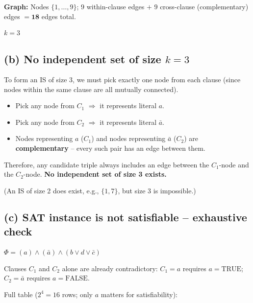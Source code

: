 \documentclass[12pt]{article}
\begin{document}
\noindent\textbf{Graph:}  Nodes $\{1,\ldots,9\}$;
$9$ within-clause edges $+$ $9$ cross-clause (complementary) edges
$= \mathbf{18}$ edges total.

$k = 3$

\subsection*{(b) No independent set of size $k = 3$}

To form an IS of size 3, we must pick exactly one node from each clause
(since nodes within the same clause are all mutually connected).

\begin{itemize}
  \item Pick any node from $C_1$ $\Rightarrow$ it represents literal $a$.
  \item Pick any node from $C_2$ $\Rightarrow$ it represents literal $\bar{a}$.
  \item Nodes representing $a$ ($C_1$) and nodes representing $\bar{a}$ ($C_2$)
        are \textbf{complementary} -- every such pair has an edge between them.
\end{itemize}

Therefore, any candidate triple always includes an edge between the $C_1$-node
and the $C_2$-node.  \textbf{No independent set of size 3 exists.}

(An IS of size 2 does exist, e.g., $\{1,7\}$, but size 3 is impossible.)

\subsection*{(c) SAT instance is not satisfiable -- exhaustive check}

$\Phi = (a)\land(\bar{a})\land(b\lor d\lor\bar{c})$

Clauses $C_1$ and $C_2$ alone are already contradictory:
$C_1 = a$ requires $a = \mathrm{TRUE}$; $C_2 = \bar{a}$ requires $a = \mathrm{FALSE}$.

Full table ($2^4 = 16$ rows; only $a$ matters for satisfiability):
\end{document}
